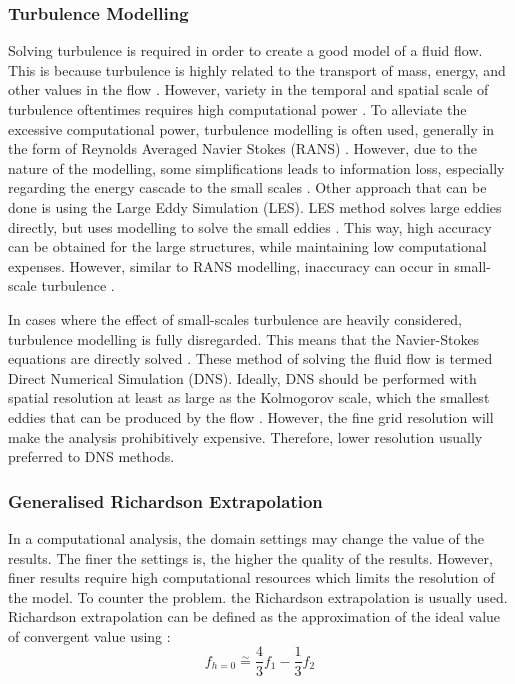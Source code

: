 \subsubsection{Turbulence Modelling}
\label{sec:litrev_turbmethod}
Solving turbulence is required in order to create a good model of a fluid flow. This is because turbulence is highly related to the transport of mass, energy, and other values in the flow \cite{Trench2023}. However, variety in the temporal and spatial scale of turbulence oftentimes requires high computational power \cite{Duraisamy2019}. To alleviate the excessive computational power, turbulence modelling is often used, generally in the form of Reynolds Averaged Navier Stokes (RANS) \cite{Sidik2020}. However, due to the nature of the modelling, some simplifications leads to information loss, especially regarding the energy cascade to the small scales \cite{bush2020}. Other approach that can be done is using the Large Eddy Simulation (LES). LES method solves large eddies directly, but uses modelling to solve the small eddies \cite{Zhiyin2015}. This way, high accuracy can be obtained for the large structures, while maintaining low computational expenses. However, similar to RANS modelling, inaccuracy can occur in small-scale turbulence \cite{Mason1994}.

In cases where the effect of small-scales turbulence are heavily considered, turbulence modelling is fully disregarded. This means that the Navier-Stokes equations are directly solved \cite{Moin1998}. These method of solving the fluid flow is termed Direct Numerical Simulation (DNS). Ideally, DNS should be performed with spatial resolution at least as large as the Kolmogorov scale, which the smallest eddies that can be produced by the flow \cite{Boschung2016}. However, the fine grid resolution will make the analysis prohibitively expensive. Therefore, lower resolution usually preferred to DNS methods. %

\subsubsection{Generalised Richardson Extrapolation}
In a computational analysis, the domain settings may change the value of the results. The finer the settings is, the higher the quality of the results. However, finer results require high computational resources which limits the resolution of the model. To counter the problem. the Richardson extrapolation is usually used. Richardson extrapolation can be defined as the approximation of the ideal value of convergent value using \cite{roache2009verification}:
\begin{equation}
	f_{h=0} \stackrel{\sim}{=} \frac43 f_1 - \frac13 f_2
\end{equation}

